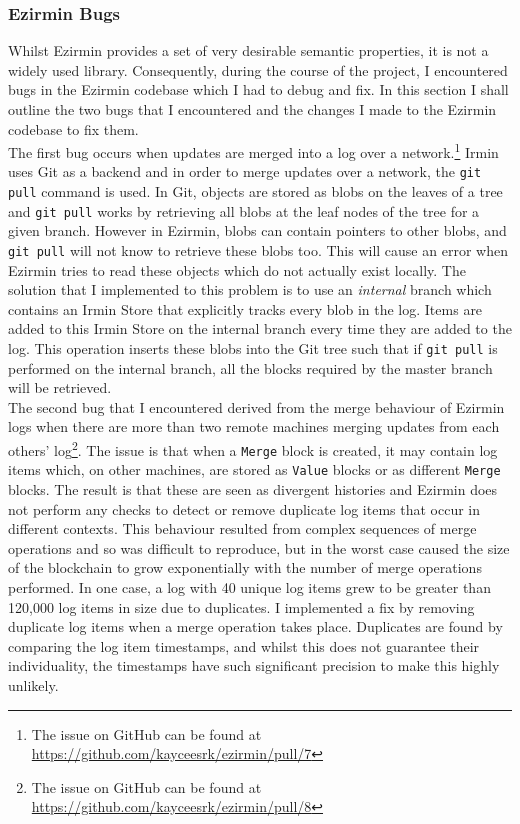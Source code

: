 \documentclass[12pt,a4paper,twoside,openright]{report}
\begin{document}
	\subsubsection*{Ezirmin Bugs}
	Whilst Ezirmin provides a set of very desirable semantic properties, it is not a widely used library. 
	Consequently, during the course of the project, I encountered bugs in the Ezirmin codebase which I had to debug and fix.
	In this section I shall outline the two bugs that I encountered and the changes I made to the Ezirmin codebase to fix them.\\
	
	The first bug occurs when updates are merged into a log over a network.\footnote{The issue on GitHub can be found at \href{https://github.com/kayceesrk/ezirmin/pull/7}{https://github.com/kayceesrk/ezirmin/pull/7}}
	Irmin uses Git as a backend and in order to merge updates over a network, the \texttt{git pull} command is used.
	In Git, objects are stored as blobs on the leaves of a tree and \texttt{git pull} works by retrieving all blobs at the leaf nodes of the tree for a given branch.
	However in Ezirmin, blobs can contain pointers to other blobs, and \texttt{git pull} will not know to retrieve these blobs too.
	This will cause an error when Ezirmin tries to read these objects which do not actually exist locally. 
	The solution that I implemented to this problem is to use an \textit{internal} branch which contains an Irmin Store that explicitly tracks every blob in the log.
	Items are added to this Irmin Store on the internal branch every time they are added to the log.
	This operation inserts these blobs into the Git tree such that if \texttt{git pull} is performed on the internal branch, all the blocks required by the master branch will be retrieved.\\

	The second bug that I encountered derived from the merge behaviour of Ezirmin logs when there are more than two remote machines merging updates from each others' log\footnote{The issue on GitHub can be found at \href{https://github.com/kayceesrk/ezirmin/pull/8}{https://github.com/kayceesrk/ezirmin/pull/8}}.
	The issue is that when a \texttt{Merge} block is created, it may contain log items which, on other machines, are stored as \texttt{Value} blocks or as different \texttt{Merge} blocks.
	The result is that these are seen as divergent histories and Ezirmin does not perform any checks to detect or remove duplicate log items that occur in different contexts.
	This behaviour resulted from complex sequences of merge operations and so was difficult to reproduce, but in the worst case caused the size of the blockchain to grow exponentially with the number of merge operations performed.
	In one case, a log with 40 unique log items grew to be greater than 120,000 log items in size due to duplicates.
	I implemented a fix by removing duplicate log items when a merge operation takes place. 
	Duplicates are found by comparing the log item timestamps, and whilst this does not guarantee their individuality, the timestamps have such significant precision to make this highly unlikely.
\end{document}
